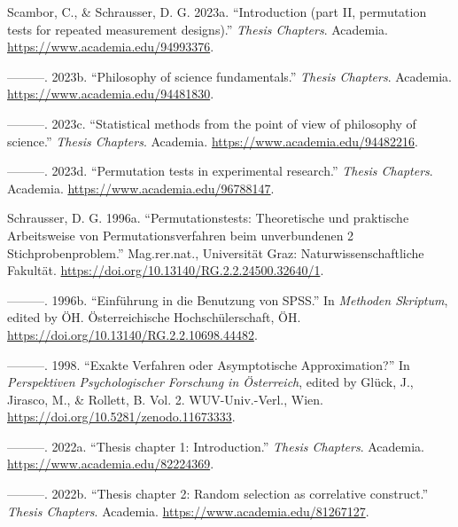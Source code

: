 \documentclass[
]{article}
\author{Dietmar Gerald SCHRAUSSER}
\date{14.04.2026}
\newlength{\cslhangindent}
\newlength{\cslentryspacingunit} %
\newenvironment{CSLReferences}[2] %
 {%
  \setlength{\parindent}{0pt}
  \ifodd #1
  \let\oldpar\par
  \def\par{\hangindent=\cslhangindent\oldpar}
  \fi
  \setlength{\parskip}{#2\cslentryspacingunit}
 }%
 {}
\begin{document}
\hypertarget{refs}{}
\begin{CSLReferences}{1}{0}
\leavevmode{}%
Scambor, C., \& Schrausser, D. G. 2023a. {``{Introduction (part II,
permutation tests for repeated measurement designs)}.''} \emph{Thesis
Chapters}. Academia. \url{https://www.academia.edu/94993376}.

\leavevmode{}%
---------. 2023b. {``{Philosophy of science fundamentals}.''}
\emph{Thesis Chapters}. Academia.
\url{https://www.academia.edu/94481830}.

\leavevmode{}%
---------. 2023c. {``{Statistical methods from the point of view of
philosophy of science}.''} \emph{Thesis Chapters}. Academia.
\url{https://www.academia.edu/94482216}.

\leavevmode{}%
---------. 2023d. {``{Permutation tests in experimental research}.''}
\emph{Thesis Chapters}. Academia.
\url{https://www.academia.edu/96788147}.

\leavevmode{}%
Schrausser, D. G. 1996a. {``{Permutationstests: Theoretische und
praktische Arbeitsweise von Permutationsverfahren beim unverbundenen 2
Stichprobenproblem}.''} Mag.rer.nat., Universität Graz:
Naturwissenschaftliche Fakultät.
\url{https://doi.org/10.13140/RG.2.2.24500.32640/1}.

\leavevmode{}%
---------. 1996b. {``{Einführung in die Benutzung von SPSS}.''} In
\emph{Methoden Skriptum}, edited by ÖH. Österreichische
Hochschülerschaft, ÖH.
\url{https://doi.org/10.13140/RG.2.2.10698.44482}.

\leavevmode{}%
---------. 1998. {``{Exakte Verfahren oder Asymptotische
Approximation?}''} In \emph{Perspektiven Psychologischer Forschung in
Österreich}, edited by Glück, J., Jirasco, M., \& Rollett, B. Vol. 2.
WUV-Univ.-Verl., Wien. \url{https://doi.org/10.5281/zenodo.11673333}.

\leavevmode{}%
---------. 2022a. {``{Thesis chapter 1: Introduction}.''} \emph{Thesis
Chapters}. Academia. \url{https://www.academia.edu/82224369}.

\leavevmode{}%
---------. 2022b. {``{Thesis chapter 2: Random selection as correlative
construct}.''} \emph{Thesis Chapters}. Academia.
\url{https://www.academia.edu/81267127}.


\end{CSLReferences}
\end{document}
